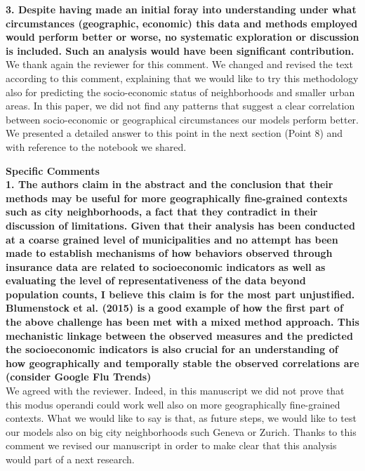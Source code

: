 \documentclass[12pt]{article}
\begin{document}
\vspace{1cm}
\textbf{3. Despite having made an initial foray into understanding under what circumstances (geographic, economic) this data and methods employed would perform better or worse, no systematic exploration or discussion is included. Such an analysis would have been significant contribution.}
\\
We thank again the reviewer for this comment. We changed and revised the text according to this comment, explaining that we would like to try this methodology also for predicting the socio-economic status of neighborhoods and smaller urban areas. In this paper, we did not find any patterns that suggest a clear correlation between socio-economic or geographical circumstances our models perform better. We presented a detailed answer to this point in the next section (Point 8) and with reference to the notebook we shared.

\vspace{1cm}
\textbf{Specific Comments\\1. The authors claim in the abstract and the conclusion that their methods may be useful for more geographically fine-grained contexts such as city neighborhoods, a fact that they contradict in their discussion of limitations. Given that their analysis has been conducted at a coarse grained level of municipalities and no attempt has been made to establish mechanisms of how behaviors observed through insurance data are related to socioeconomic indicators as well as evaluating the level of representativeness of the data beyond population counts, I believe this claim is for the most part unjustified. Blumenstock et al. (2015) is a good example of how the first part of the above challenge has been met with a mixed method approach. This mechanistic linkage between the observed measures and the predicted the socioeconomic indicators is also crucial for an understanding of how geographically and temporally stable the observed correlations are (consider Google Flu Trends)
}
\\
We agreed with the reviewer. Indeed, in this manuscript we did not prove that this modus operandi could work well also on more geographically fine-grained contexts. What we would like to say is that, as future steps, we would like to test our models also on  big city neighborhoods such Geneva or Zurich. Thanks to this comment we revised our manuscript in order to make clear that this analysis would part of a next research.
\end{document}
